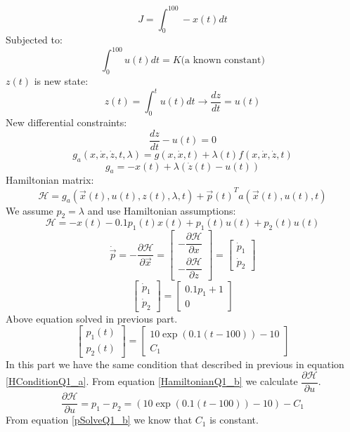 $$J = \int_0^{100}-x(t)dt$$
Subjected to:
$$\int_0^{100}u(t)dt = K\text{(a known constant)}$$
$z(t)$ is new state:
$$z(t) = \int_0^{t}u(t)dt \to \dfrac{dz}{dt} =u(t) $$
New differential constraints:
$$\dfrac{dz}{dt} - u(t) = 0$$
$$g_a(x, \dot x, \dot z, t, \lambda) = g(x, \dot x, t) + \lambda(t)f(x, \dot x, \dot z, t) $$
$$g_a = -x(t) + \lambda (\dot z (t)- u(t))$$
Hamiltonian matrix:
$$\mathcal{H} =  g_a(\vec x(t), u(t), z(t), \lambda,  t) + {\vec{p}(t)}^Ta(\vec x(t), u(t), t)$$
We assume $p_2 = \lambda$ and use Hamiltonian assumptions:
\begin{equation}\label{HamiltonianQ1_b}
\mathcal{H} = -x(t)  -0.1p_1(t)x(t)+p_1(t)u(t) + p_2(t)u(t)
\end{equation}
$$\dot{\vec{p}} = -\dfrac{\partial \mathcal{H} }{\partial \vec x} =  \begin{bmatrix}
	 -\dfrac{\partial \mathcal{H} }{\partial x} \\[10pt]
	 -\dfrac{\partial \mathcal{H} }{\partial z} 
\end{bmatrix} = 
\begin{bmatrix}
	\dot p_1 \\
	\dot p_2
\end{bmatrix}
$$
$$
\begin{bmatrix}
	\dot p_1 \\
	\dot p_2
\end{bmatrix} = \begin{bmatrix}
 0.1p_1+1\\
0
\end{bmatrix}
$$
Above equation solved in previous part.
\begin{equation}\label{pSolveQ1_b}
	\begin{bmatrix}
		p_1(t)\\
		p_2(t)
	\end{bmatrix} = 
	\begin{bmatrix}
		10\exp \left(0.1(t-100)\right)-10\\
		C_1
	\end{bmatrix}
\end{equation}
In this part we have the same condition that described in previous in equation \ref{HConditionQ1_a}.
From equation \ref{HamiltonianQ1_b} we calculate $\dfrac{\partial \mathcal{H}}{\partial u}$.
$$\dfrac{\partial \mathcal{H}}{\partial u} = p_1 - p_2 = \left(10\exp \left(0.1(t-100)\right)-10\right)-C_1$$
From equation \ref{pSolveQ1_b} we know that $C_1$ is constant.


